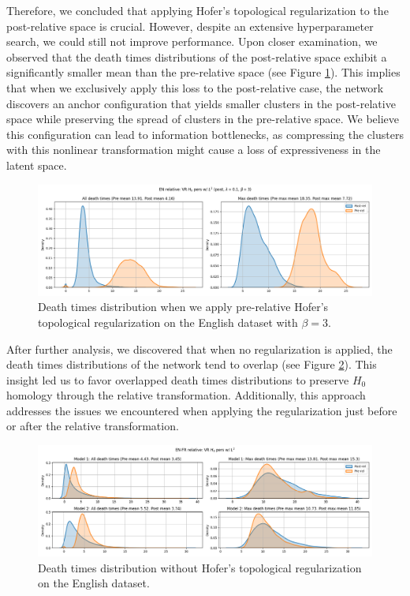 \documentclass[../main.tex]{subfiles}
\begin{document}
Therefore, we concluded that applying Hofer's topological regularization to the post-relative space is crucial. However, despite an extensive hyperparameter search, we could still not improve performance. Upon closer examination, we observed that the death times distributions of the post-relative space exhibit a significantly smaller mean than the pre-relative space (see Figure \ref{fig:distPost}). This implies that when we exclusively apply this loss to the post-relative case, the network discovers an anchor configuration that yields smaller clusters in the post-relative space while preserving the spread of clusters in the pre-relative space. We believe this configuration can lead to information bottlenecks, as compressing the clusters with this nonlinear transformation might cause a loss of expressiveness in the latent space.\\

\begin{figure}[!ht]
    \centering
    \includegraphics[width=\textwidth]{figures/rs/stitching/en_relative_post_3_seed0.png} 
    \caption{Death times distribution when we apply pre-relative Hofer's topological regularization on the English dataset with $\beta=3$.}
    \label{fig:distPost}
\end{figure}

After further analysis, we discovered that when no regularization is applied, the death times distributions of the network tend to overlap (see Figure \ref{fig:distVanilla}). This insight led us to favor overlapped death times distributions to preserve $H_0$ homology through the relative transformation. Additionally, this approach addresses the issues we encountered when applying the regularization just before or after the relative transformation.\\

\begin{figure}[ht!]
    \centering
    \includegraphics[width=\textwidth]{figures/rs/stitching/en_fr_relative_seed1.png} 
    \caption{Death times distribution without Hofer's topological regularization on the English dataset.}
    \label{fig:distVanilla}
\end{figure}
\end{document}
